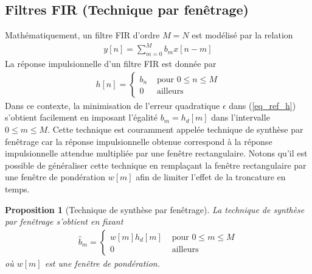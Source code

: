 \documentclass[11pt,a4paper]{IEEEtran}
\newtheorem{proposition}{Proposition}
\begin{document}
\subsection{Filtres FIR (Technique par fenêtrage)}

Mathématiquement, un filtre FIR d'ordre $M=N$ est modélisé par la relation
\begin{align}
y[n]=\sum_{m=0}^{M} b_m x[n-m]
\end{align}
La réponse impulsionnelle d'un filtre FIR est donnée par
\begin{align}
h[n]=\left\{\begin{array}{cl}b_n&\textrm{ pour }0\le n \le M\\
0& \textrm{ ailleurs}
\end{array}\right.
\end{align}
Dans ce contexte, la minimisation de l'erreur quadratique $\epsilon$ dans (\ref{eq_ref_h}) s'obtient facilement en imposant l'égalité $b_m=h_d[m]$ dans l'intervalle $0\le m \le M$. Cette technique est couramment appelée technique de synthèse par fenêtrage car la réponse impulsionnelle obtenue correspond à la réponse impulsionnelle attendue multipliée par une fenêtre rectangulaire. Notons qu'il est possible de généraliser cette technique en remplaçant la fenêtre rectangulaire par une fenêtre de pondération $w[m]$ afin de limiter l'effet de la troncature en temps.
\begin{proposition}[Technique de synthèse par fenêtrage]
La technique de synthèse par fenêtrage s'obtient en fixant 
\begin{align}
\widehat{b}_m=\left\{\begin{array}{cl}w[m]h_d[m]&\textrm{ pour }0\le m \le M\\
0& \textrm{ ailleurs}
\end{array}\right.
\end{align}
où $w[m]$ est une fenêtre de pondération.
\end{proposition}
\end{document}
